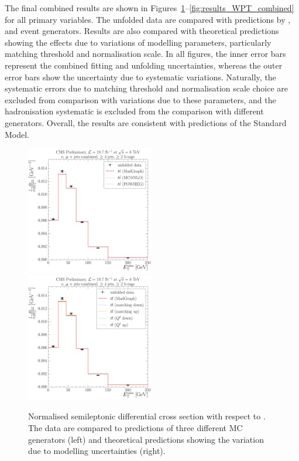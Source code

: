 The final combined results are shown in Figures~\ref{fig:results_MET_combined}--\ref{fig:results_WPT_combined} for all
primary variables. The unfolded data are compared with predictions by \MADGRAPH, \POWHEG and \MCATNLO event generators.
Results are also compared with theoretical predictions showing the effects due to variations of modelling parameters,
particularly matching threshold and normalisation scale. In all figures, the inner error bars represent the combined
fitting and unfolding uncertainties, whereas the outer error bars show the uncertainty due to systematic variations.
Naturally, the systematic errors due to matching threshold and normalisation scale choice are excluded from comparison
with variations due to these parameters, and the hadronisation systematic is excluded from the comparison with different
generators. Overall, the results are consistent with predictions of the Standard Model.


\begin{figure}[!htbp]
	\centering
  	{\includegraphics[width=0.5\textwidth]{measurement/MET/central/normalised_xsection_combined_different_generators}}\hfill
  	{\includegraphics[width=0.5\textwidth]{measurement/MET/central/normalised_xsection_combined_systematics_shifts}}
    \caption[Normalised semileptonic \ttbar differential cross section with respect to \MET]{Normalised semileptonic
      \ttbar differential cross section with respect to \MET. The data are compared to predictions of three different MC
      generators (left) and theoretical predictions showing the variation due to modelling uncertainties (right).}
    \label{fig:results_MET_combined}
\end{figure}

